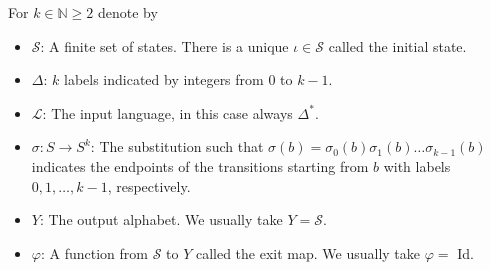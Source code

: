\documentclass{article}
\begin{document}
\begin{definition}[$k$-automaton] \label{def:k-aut}
For $k \in \mathbb{N} \ge 2$ denote by
\begin{itemize}
\item $\mathcal{S}$: A finite set of states. There is a unique 
      $\iota \in \mathcal{S}$ called the initial state.
\item $\Delta$: $k$ labels indicated by integers from 0 to $k - 1$.
\item $\mathcal{L}$: The input language, in this case always $\Delta^*$.
\item $\sigma: S \to S^k$: The substitution such that 
      $\sigma(b) = \sigma_0(b) \sigma_1(b) \ldots \sigma_{k - 1}(b)$ indicates 
      the endpoints of the transitions starting from $b$ with labels 
      $0, 1, \ldots, k - 1$, respectively.
\item $Y$: The output alphabet. We usually take $Y = \mathcal{S}$.
\item $\varphi$: A function from $\mathcal{S}$ to $Y$ called the exit map. We
      usually take $\varphi =$ Id.
\end{itemize}
\end{definition}
\end{document}

